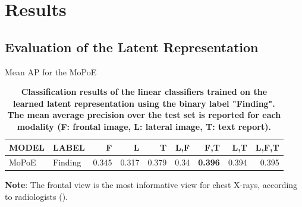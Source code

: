     
    \section{Results}

    \subsection{Evaluation of the Latent Representation}
    
    \begin{frame}{Mean AP for the MoPoE}
            \begin{table}
            \centering
            \begin{tabular}{llrrrrrrr}
            MODEL & LABEL &      F &      L &      T &   L,F &    F,T &    L,T &  L,F,T \\
            \midrule
            MoPoE & Finding &  0.345 &  0.317 &  0.379 &  0.34 &  \textbf{0.396} &  0.394 &  0.395 \\
            
            \end{tabular}
            \caption{\textbf{Classification results of the linear classifiers trained on the learned latent representation using the binary label "Finding". The mean average precision over the test set
is reported for each modality (F: frontal image, L: lateral image, T: text report).}}
            \end{table}
    \pause
    \small{\textbf{Note}: The frontal view is the most informative view for chest X-rays, according to radiologists (\cite{kovaleva2020towards}).}
    \end{frame}
    
